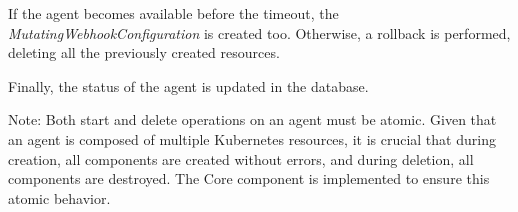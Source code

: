 If the agent becomes available before the timeout, the \emph{MutatingWebhookConfiguration} is created too. Otherwise, a rollback is performed, deleting all the previously created resources.

Finally, the status of the agent is updated in the database.

Note: Both start and delete operations on an agent must be atomic. Given that an agent is composed of multiple Kubernetes resources, it is crucial that during creation, all components are created without errors, and during deletion, all components are destroyed. The Core component is implemented to ensure this atomic behavior.
